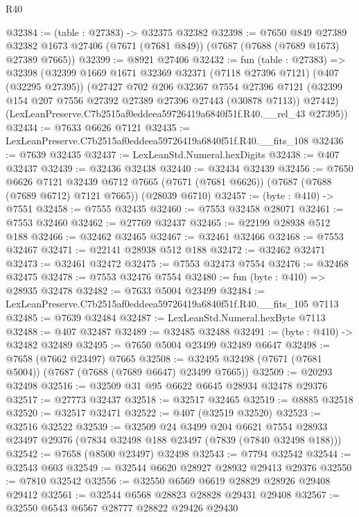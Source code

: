 \begin{lexlean}{R40}
\begin{coremodule}
@32384 := (table : @27383) -> @32375 @32382
@32398 := @7650
    @849
    @27389
    @32382
    @1673
    @27406
    (@7671 (@7681 @849))
    (@7687 (@7688 (@7689 @1673) @27389 @7665))
@32399 := @8921 @27406
@32432 := fun (table : @27383) =>
  @32398
    (@32399
      @1669
      @1671
      @32369
      @32371
      (@7118 @27396 @7121)
      (@407 (@32295 @27395))
      (@27427
        @702
        @206
        @32367
        @7554
        @27396
        @7121
        (@32399 @154 @207 @7556 @27392 @27389 @27396 @27443 (@30878 @7113))
        @27442)
      (LexLeanPreserve.C7b2515af0eddeea59726419a6840f51f.R40.__rel_43 @27395))
@32434 := @7633 @6626 @7121
@32435 := LexLeanPreserve.C7b2515af0eddeea59726419a6840f51f.R40.__fits_108
@32436 := @7639 @32435
@32437 := LexLeanStd.Numeral.hexDigits
@32438 := @407 @32437
@32439 := @32436 @32438
@32440 := @32434 @32439
@32456 := @7650
    @6626
    @7121
    @32439
    @6712
    @7665
    (@7671 (@7681 @6626))
    (@7687 (@7688 (@7689 @6712) @7121 @7665))
    (@28039 @6710)
@32457 := (byte : @410) -> @7551
@32458 := @7555 @32435
@32460 := @7553 @32458 @28071
@32461 := @7553 @32460
@32462 := @27769 @32437
@32465 := @22199 @28938 @512 @188
@32466 := @32462 @32465
@32467 := @32461 @32466
@32468 := @7553 @32467
@32471 := @22141 @28938 @512 @188
@32472 := @32462 @32471
@32473 := @32461 @32472
@32475 := @7553 @32473 @7554
@32476 := @32468 @32475
@32478 := @7553 @32476 @7554
@32480 := fun (byte : @410) => @28935 @32478
@32482 := @7633 @5004 @23499
@32484 := LexLeanPreserve.C7b2515af0eddeea59726419a6840f51f.R40.__fits_105 @7113
@32485 := @7639 @32484
@32487 := LexLeanStd.Numeral.hexByte @7113
@32488 := @407 @32487
@32489 := @32485 @32488
@32491 := (byte : @410) -> @32482 @32489
@32495 := @7650 @5004 @23499 @32489 @6647
@32498 := @7658 (@7662 @23497) @7665
@32508 := @32495 @32498 (@7671 (@7681 @5004)) (@7687 (@7688 (@7689 @6647) @23499 @7665))
@32509 := @20293 @32498
@32516 := @32509 @31 @95 @6622 @6645 @28934 @32478 @29376
@32517 := @27773 @32437
@32518 := @32517 @32465
@32519 := @8885 @32518
@32520 := @32517 @32471
@32522 := @407 (@32519 @32520)
@32523 := @32516 @32522
@32539 := @32509
    @24
    @3499
    @204
    @6621
    @7554
    @28933
    @23497
    @29376
    (@7834 @32498 @188 @23497 (@7839 (@7840 @32498 @188)))
@32542 := @7658 (@8500 @23497) @32498
@32543 := @7794 @32542
@32544 := @32543 @603
@32549 := @32544 @6620 @28927 @28932 @29413 @29376
@32550 := @7810 @32542
@32556 := @32550 @6569 @6619 @28829 @28926 @29408 @29412
@32561 := @32544 @6568 @28823 @28828 @29431 @29408
@32567 := @32550 @6543 @6567 @28777 @28822 @29426 @29430

\end{coremodule}
\end{lexlean}
